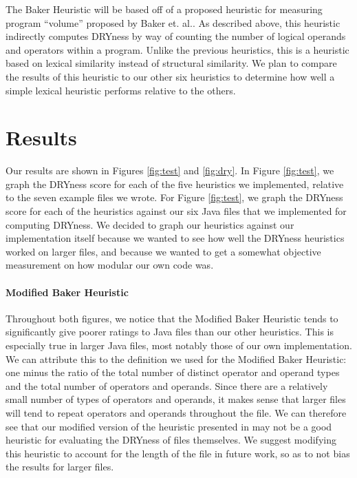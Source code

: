 \documentclass{article}
\begin{document}
The Baker Heuristic will be based off of a proposed heuristic for measuring program ``volume'' proposed
by Baker et. al.\cite{Modularity1979}. As described above, this heuristic indirectly computes DRYness by way of counting the
number of logical operands and operators within a program. Unlike the previous heuristics, this is a heuristic based on
lexical similarity instead of structural similarity. We plan to compare the results of this heuristic to our other six
heuristics to determine how well a simple lexical heuristic performs relative to the others.

\section{Results}

Our results are shown in Figures \ref{fig:test} and \ref{fig:dry}. In Figure \ref{fig:test}, we graph the DRYness score for each of the five heuristics we implemented, relative to the seven example files we wrote. For Figure \ref{fig:test}, we graph
the DRYness score for each of the heuristics against our six Java files that we implemented for computing DRYness. We decided to
graph our heuristics against our implementation itself because we wanted to see how well the DRYness heuristics worked on larger
files, and because we wanted to get a somewhat objective measurement on how modular our own code was.

\paragraph{Modified Baker Heuristic}
Throughout both figures, we notice that the Modified Baker Heuristic tends to significantly give poorer ratings to Java files
than our other heuristics. This is especially true in larger Java files, most notably those of our own implementation. We can attribute this to the definition we used for the Modified Baker Heuristic: one minus the ratio of the total number of distinct operator and operand types and the total number of operators and operands.
Since there are a relatively small number of types of operators and operands, it makes sense that larger files will tend to repeat
operators and operands throughout the file. We can therefore see that our modified version of the heuristic presented in \cite{Baker1979}
may not be a good heuristic for evaluating the DRYness of files themselves. We suggest modifying this heuristic to account for the length
of the file in future work, so as to not bias the results for larger files.
\end{document}

